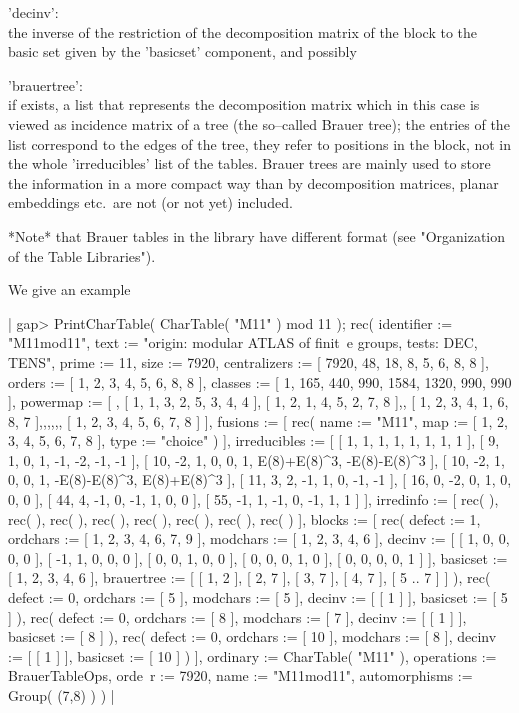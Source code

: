 'decinv': \\
     the inverse of the restriction of the decomposition matrix of the
     block to the basic set given by the 'basicset' component,
     and possibly

'brauertree': \\
     if exists, a list that represents the decomposition matrix which in
     this case is viewed as incidence matrix of a tree (the so--called
     Brauer tree); the entries of the list correspond to the edges of the
     tree, they refer to positions in the block, not in the whole
     'irreducibles' list of the tables.  Brauer trees are mainly used to
     store the information in a more compact way than by decomposition
     matrices, planar embeddings etc.\ are not (or not yet) included.

*Note* that Brauer tables in the library have different format
(see "Organization of the Table Libraries").

We give an example\:

|    gap> PrintCharTable( CharTable( "M11" ) mod 11 );
    rec( identifier := "M11mod11", text := "origin: modular ATLAS of finit\
    e groups, tests: DEC, TENS", prime := 11, size :=
    7920, centralizers := [ 7920, 48, 18, 8, 5, 6, 8, 8 ], orders :=
    [ 1, 2, 3, 4, 5, 6, 8, 8 ], classes :=
    [ 1, 165, 440, 990, 1584, 1320, 990, 990 ], powermap :=
    [ , [ 1, 1, 3, 2, 5, 3, 4, 4 ], [ 1, 2, 1, 4, 5, 2, 7, 8 ],,
      [ 1, 2, 3, 4, 1, 6, 8, 7 ],,,,,, [ 1, 2, 3, 4, 5, 6, 7, 8 ]
     ], fusions := [ rec(
          name := "M11",
          map := [ 1, 2, 3, 4, 5, 6, 7, 8 ],
          type := "choice" ) ], irreducibles :=
    [ [ 1, 1, 1, 1, 1, 1, 1, 1 ], [ 9, 1, 0, 1, -1, -2, -1, -1 ],
      [ 10, -2, 1, 0, 0, 1, E(8)+E(8)^3, -E(8)-E(8)^3 ],
      [ 10, -2, 1, 0, 0, 1, -E(8)-E(8)^3, E(8)+E(8)^3 ],
      [ 11, 3, 2, -1, 1, 0, -1, -1 ], [ 16, 0, -2, 0, 1, 0, 0, 0 ],
      [ 44, 4, -1, 0, -1, 1, 0, 0 ], [ 55, -1, 1, -1, 0, -1, 1, 1 ]
     ], irredinfo := [ rec(
           ), rec(
           ), rec(
           ), rec(
           ), rec(
           ), rec(
           ), rec(
           ), rec(
           ) ], blocks := [ rec(
          defect := 1,
          ordchars := [ 1, 2, 3, 4, 6, 7, 9 ],
          modchars := [ 1, 2, 3, 4, 6 ],
          decinv :=
           [ [ 1, 0, 0, 0, 0 ], [ -1, 1, 0, 0, 0 ], [ 0, 0, 1, 0, 0 ],
              [ 0, 0, 0, 1, 0 ], [ 0, 0, 0, 0, 1 ] ],
          basicset := [ 1, 2, 3, 4, 6 ],
          brauertree :=
           [ [ 1, 2 ], [ 2, 7 ], [ 3, 7 ], [ 4, 7 ], [ 5 .. 7 ] ] ), rec(
          defect := 0,
          ordchars := [ 5 ],
          modchars := [ 5 ],
          decinv := [ [ 1 ] ],
          basicset := [ 5 ] ), rec(
          defect := 0,
          ordchars := [ 8 ],
          modchars := [ 7 ],
          decinv := [ [ 1 ] ],
          basicset := [ 8 ] ), rec(
          defect := 0,
          ordchars := [ 10 ],
          modchars := [ 8 ],
          decinv := [ [ 1 ] ],
          basicset := [ 10 ] )
     ], ordinary := CharTable( "M11" ), operations := BrauerTableOps, orde\
    r := 7920, name := "M11mod11", automorphisms := Group( (7,8) ) ) |

